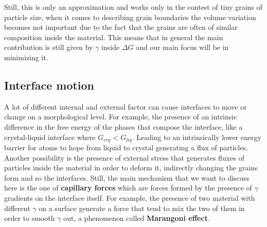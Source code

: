 Still, this is only an approximation and works only in the contest of tiny grains of particle size, when it comes to describing grain boundaries the volume variation becomes not important due to the fact that the grains are often of similar composition inside the material. This means that in general the main contribution is still given by $\gamma$ inside $\Delta G$ and our main focus will be in minimizing it.

\subsection{Interface motion}

A lot of different internal and external factor can cause interfaces to move or change on a morphological level. For example, the presence of an intrinsic difference in the free energy of the phases that compose the interface, like a crystal-liquid interface where $G_{cry} < G_{liq}$. Leading to an intrinsically lower energy barrier for atoms to hope from liquid to crystal generating a flux of particles. Another possibility is the presence of external stress that generates fluxes of particles inside the material in order to deform it, indirectly changing the grains form and so the interfaces. Still, the main mechanism that we want to discuss here is the one of \textbf{capillary forces} which are forces formed by the presence of $\gamma$ gradients on the interface itself. For example, the presence of two material with different $\gamma$ on a  surface generate a force that tend to mix the two of them in order to smooth $\gamma$ out, a phenomenon called \textbf{Marangoni effect}.

